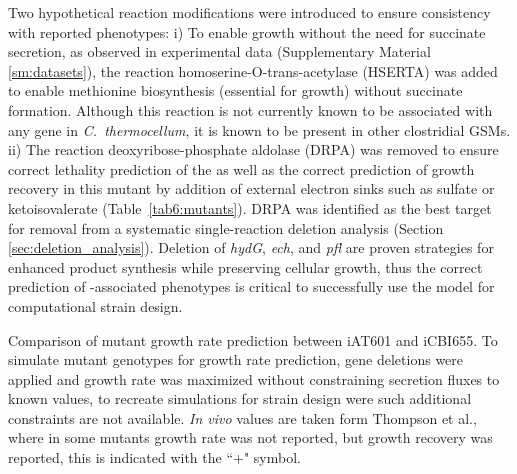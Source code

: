 Two hypothetical reaction modifications were introduced to ensure consistency with reported phenotypes:
i) To enable growth without the need for succinate secretion, as observed in experimental data (Supplementary Material \ref{sm:datasets}), the reaction homoserine-O-trans-acetylase (HSERTA) was added to enable methionine biosynthesis (essential for growth) without succinate formation.
Although this reaction is not currently known to be associated with any gene in \textit{C.~thermocellum}, it is known to be present in other clostridial GSMs. \citep{nagarajan2013}
ii) The reaction deoxyribose-phosphate aldolase (DRPA) was removed to ensure correct lethality prediction of the  as well as the correct prediction of growth recovery in this mutant by addition of external electron sinks such as sulfate or ketoisovalerate (Table~\ref{tab6:mutants}). DRPA  was identified as the best target for removal from a systematic single-reaction deletion analysis (Section \ref{sec:deletion_analysis}).
Deletion of \textit{hydG}, \textit{ech}, and \textit{pfl}  are proven strategies for enhanced product synthesis while preserving cellular growth, \citep{biswas2015, thompson2015, tian2016}
thus the correct prediction of -associated phenotypes is critical to successfully use the model for computational strain design.\citep{long2015, ng2015, maranas2016, wang2018,garcia2019, garcia2019b, garcia2019c}

\begin{table}[ph]
    \caption[Comparison of mutant growth rate prediction between iAT601 and iCBI655 models]{Comparison of mutant growth rate prediction between iAT601 and iCBI655. To simulate mutant genotypes for growth rate prediction, gene deletions were applied and growth rate was maximized without constraining secretion fluxes to known values, to recreate simulations for strain design were such additional constraints are not available. \textit{In vivo} values are taken form Thompson et al.\citep{thompson2015}, where in some mutants growth rate was not reported, but growth recovery was reported, this is indicated with the ``+" symbol.}
    \centering
    
    \label{tab6:mutants}
\end{table}




